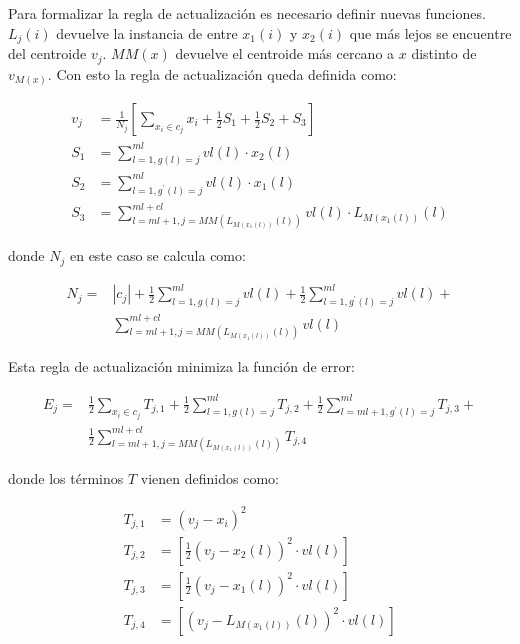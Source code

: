 Para formalizar la regla de actualización es necesario definir nuevas funciones. $L_j(i)$ devuelve la instancia de entre $x_1(i)$ y $x_2(i)$ que más lejos se encuentre del centroide $v_j$. $MM(x)$ devuelve el centroide más cercano a $x$ distinto de $v_{M(x)}$. Con esto la regla de actualización queda definida como:

\begin{equation}
\begin{split}
v_j &= \frac{1}{N_j} \left[ \sum_{x_i \in c_j} x_i + 
\frac{1}{2} S_1 + \frac{1}{2} S_2 + S_3 \right]\\
S_1 &= \sum_{l=1,g(l) = j}^{ml} vl(l) \cdot x_2(l) \\
S_2 &= \sum_{l=1,g^\prime(l) = j}^{ml} vl(l) \cdot x_1(l) \\
S_3 &= \sum_{l=ml+1, j = MM(L_{M(x_1(l))}(l))}^{ml + cl} vl(l) \cdot L_{M(x_1(l))}(l)
\end{split}
\label{eqn38}
\end{equation}

donde $N_j$ en este caso se calcula como:

\begin{equation}
\begin{split}
N_j = & |c_j| + \frac{1}{2} \sum_{l=1,g(l) = j}^{ml} vl(l) + 
\frac{1}{2} \sum_{l=1,g^\prime (l) = j}^{ml} vl(l) + \\
& \sum_{l=ml+1,j = MM(L_{M(x_1(l))}(l))}^{ml + cl} vl(l)
\end{split}
\label{eqn41}
\end{equation}

Esta regla de actualización minimiza la función de error:

\begin{equation}
\begin{split}
E_j = & \frac{1}{2} \sum_{x_i \in c_j} T_{j,1} + 
\frac{1}{2} \sum_{l=1,g(l) = j}^{ml} T_{j,2} + 
\frac{1}{2} \sum_{l=ml + 1,g^\prime(l) = j}^{ml} T_{j,3} + \\
&\frac{1}{2} \sum_{l=ml+1,j = MM(L_{M(x_1(l))}(l))}^{ml + cl} T_{j,4}
\end{split}
\label{eqn42}
\end{equation}

donde los términos $T$ vienen definidos como:

\begin{equation}
\begin{split}
T_{j,1} &= (v_j - x_i)^2\\
T_{j,2} &= \left[ \frac{1}{2} (v_j - x_2(l))^2 \cdot vl(l) \right]\\
T_{j,3} &= \left[ \frac{1}{2} (v_j - x_1(l))^2 \cdot vl(l) \right]\\
T_{j,4} &= \left[ (v_j - L_{M(x_1(l))}(l))^2 \cdot vl(l) \right]
\end{split}
\label{eqn43}
\end{equation}

